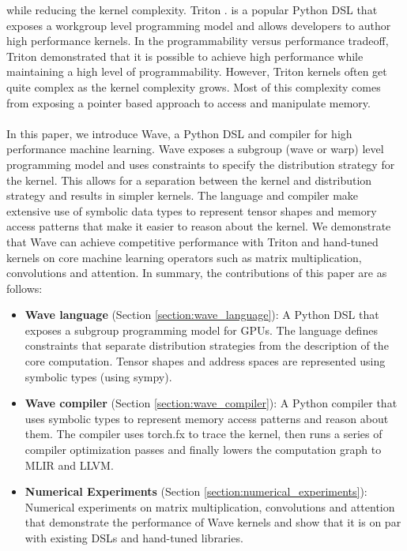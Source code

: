 \documentclass{article}
\begin{document}
while reducing the kernel complexity. Triton \cite{tillet_triton_2019}.
is a popular Python DSL that exposes a workgroup level programming
model and allows developers to author high performance kernels.
In the programmability versus performance tradeoff, Triton demonstrated that it is possible to
achieve high performance while maintaining a high level of programmability. However,
Triton kernels often get quite complex as the kernel complexity grows. Most of this complexity
comes from exposing a pointer based approach to access and manipulate memory.
\\ \\
In this paper, we introduce Wave, a Python DSL and compiler for high performance machine learning.
Wave exposes a subgroup (wave or warp) level programming model and uses constraints
to specify the distribution strategy for the kernel. This allows for a separation between
the kernel and distribution strategy and results in simpler kernels. The language
and compiler make extensive use of symbolic data types to represent tensor shapes and memory access patterns
that make it easier to reason about the kernel. We demonstrate that Wave can achieve competitive performance
with Triton and hand-tuned kernels on core machine learning operators such as matrix multiplication,
convolutions and attention.
In summary, the contributions of this paper are as follows:
\begin{itemize}
    \item \textbf{Wave language} (Section \ref{section:wave_language}): A Python DSL that exposes a subgroup programming model for GPUs. The language
    defines constraints that separate distribution strategies from the description of the core computation. Tensor shapes and address spaces
    are represented using symbolic types (using sympy).
    \item \textbf{Wave compiler} (Section \ref{section:wave_compiler}): A Python compiler that uses symbolic types
    to represent memory access patterns and reason about them. The compiler uses torch.fx to trace the kernel,
    then runs a series of compiler optimization passes and finally lowers the computation graph to MLIR and LLVM.
    \item \textbf{Numerical Experiments} (Section \ref{section:numerical_experiments}): Numerical experiments on
    matrix multiplication, convolutions and attention that demonstrate the performance of Wave kernels and show
    that it is on par with existing DSLs and hand-tuned libraries.

\end{itemize}
\end{document}
